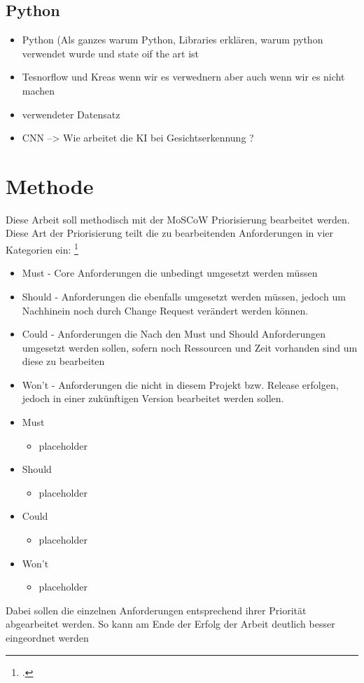 \documentclass[12pt, a4paper]{scrbook}
\begin{document}
\section{Python}
\begin{itemize}
\item Python (Als ganzes warum Python, Libraries erklären, warum python verwendet wurde und state oif the art ist
\item Tesnorflow und Kreas wenn wir es verwednern aber auch wenn wir es nicht machen
\item verwendeter Datensatz
\item CNN --> Wie arbeitet die KI bei Gesichtserkennung ?
\end{itemize}
\let\cleardoublepage\relax
\newpage
\chapter{Methode}
Diese Arbeit soll methodisch mit der MoSCoW Priorisierung bearbeitet werden. Diese Art der Priorisierung teilt die zu bearbeitenden Anforderungen in vier Kategorien ein:
\footcite[vgl.][90]{Projektmanagement}
\begin{itemize}
\item Must - Core Anforderungen die unbedingt umgesetzt werden müssen
\item Should - Anforderungen die ebenfalls umgesetzt werden müssen, jedoch um Nachhinein noch durch Change Request verändert werden können.
\item Could - Anforderungen die Nach den Must und Should Anforderungen umgesetzt werden sollen, sofern noch Ressourcen und Zeit vorhanden sind um diese zu bearbeiten
\item Won't - Anforderungen die nicht in diesem Projekt bzw. Release erfolgen, jedoch in einer zukünftigen Version bearbeitet werden sollen. 
\end{itemize}


\begin{itemize}
\item Must
\begin{itemize}
\item placeholder
\end{itemize}
\item Should
\begin{itemize}
\item placeholder
\end{itemize}
\item Could
\begin{itemize}
\item placeholder
\end{itemize}
\item Won't
\begin{itemize}
\item placeholder
\end{itemize}
\end{itemize}
Dabei sollen die einzelnen Anforderungen entsprechend ihrer Priorität abgearbeitet werden. So kann am Ende der Erfolg der Arbeit deutlich besser eingeordnet werden
\end{document}
